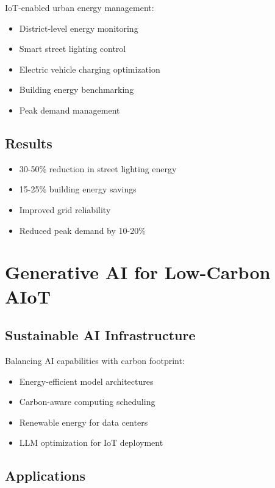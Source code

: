 \documentclass[12pt,a4paper]{article}
\begin{document}
IoT-enabled urban energy management:
\begin{itemize}
    \item District-level energy monitoring
    \item Smart street lighting control
    \item Electric vehicle charging optimization
    \item Building energy benchmarking
    \item Peak demand management
\end{itemize}

\subsection{Results}

\begin{itemize}
    \item 30-50\% reduction in street lighting energy
    \item 15-25\% building energy savings
    \item Improved grid reliability
    \item Reduced peak demand by 10-20\%
\end{itemize}

\section{Generative AI for Low-Carbon AIoT}

\subsection{Sustainable AI Infrastructure}

Balancing AI capabilities with carbon footprint:
\begin{itemize}
    \item Energy-efficient model architectures
    \item Carbon-aware computing scheduling
    \item Renewable energy for data centers
    \item LLM optimization for IoT deployment
\end{itemize}

\subsection{Applications}
\end{document}
